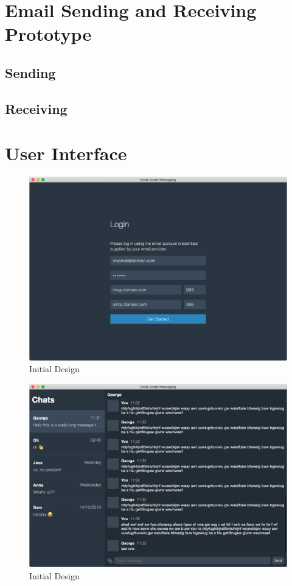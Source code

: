 \section{Email Sending and Receiving Prototype}
\subsection{Sending}

\subsection{Receiving}

\section{User Interface}
\begin{figure}[h!]
  \centering
  \includegraphics[width=\textwidth]{images/implementation-login.png}
  \caption{Initial Design}
\end{figure}

\begin{figure}[h!]
  \centering
  \includegraphics[width=\textwidth]{images/implementation-main.png}
  \caption{Initial Design}
\end{figure}